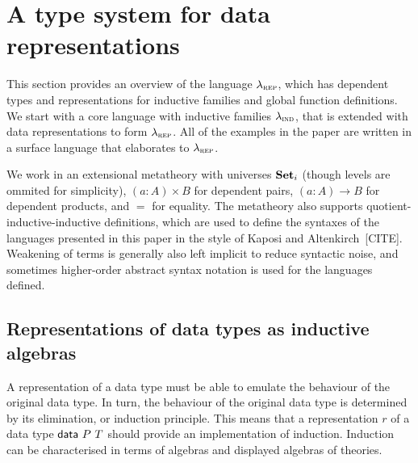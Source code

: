 \section{A type system for data representations}\label{sec:type-system}

This section provides an overview of the language $\lambda_{\textsc{rep}}$, which has
dependent types and representations for inductive families and global function
definitions. We start with a core language with inductive families $\lambda_{\textsc{ind}}$,
that is extended with data representations to form $\lambda_{\textsc{rep}}$. All of the
examples in the paper are written in a surface language that elaborates to
$\lambda_{\textsc{rep}}$.

We work in an extensional metatheory with universes $\mathbf{Set}_i$ (though levels are
ommited for simplicity), $(a : A) \times B$ for dependent pairs, $(a : A) \to B$
for dependent products, and $=$ for equality. The metatheory also supports
quotient-inductive-inductive definitions, which are used to define the syntaxes
of the languages presented in this paper in the style of Kaposi and
Altenkirch~[CITE]. Weakening of terms is generally also left implicit to reduce
syntactic noise, and sometimes higher-order abstract syntax notation is used for the
languages defined.







\newcommand{\ValidCase}{\mta{ValidCase}}

\subsection{Representations of data types as inductive algebras}

A representation of a data type must be able to emulate the behaviour of the
original data type. In turn, the behaviour of the original data type is
determined by its elimination, or induction principle. This means that a
representation $r$ of a data type $\textsf{data}\ P\ T$ should provide an
implementation of induction. Induction can be characterised in terms of algebras 
and displayed algebras of theories.

